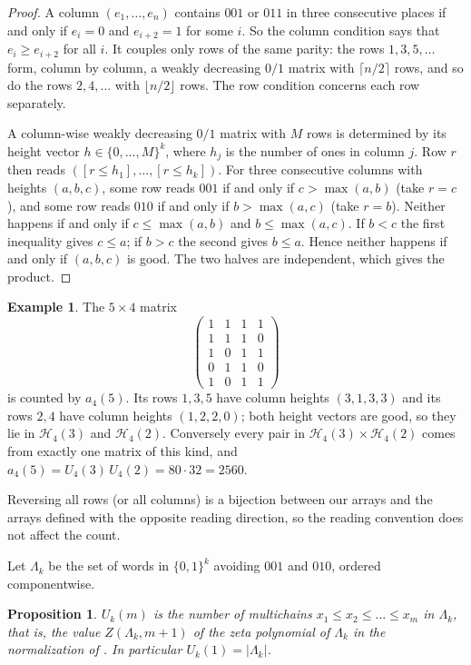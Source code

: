 \documentclass[11pt]{amsart}
\newtheorem{proposition}[theorem]{Proposition}
\theoremstyle{definition}
\newtheorem{example}[theorem]{Example}
\begin{document}
\begin{proof}
A column $(e_1,\dots,e_n)$ contains $001$ or $011$ in three consecutive places if and only if $e_i=0$ and $e_{i+2}=1$ for some $i$. So the column condition says that $e_i\ge e_{i+2}$ for all $i$. It couples only rows of the same parity: the rows $1,3,5,\dots$ form, column by column, a weakly decreasing $0/1$ matrix with $\lceil n/2\rceil$ rows, and so do the rows $2,4,\dots$ with $\lfloor n/2\rfloor$ rows. The row condition concerns each row separately.

A column-wise weakly decreasing $0/1$ matrix with $M$ rows is determined by its height vector $h\in\{0,\dots,M\}^k$, where $h_j$ is the number of ones in column $j$. Row $r$ then reads $([r\le h_1],\dots,[r\le h_k])$. For three consecutive columns with heights $(a,b,c)$, some row reads $001$ if and only if $c>\max(a,b)$ (take $r=c$), and some row reads $010$ if and only if $b>\max(a,c)$ (take $r=b$). Neither happens if and only if $c\le\max(a,b)$ and $b\le\max(a,c)$. If $b<c$ the first inequality gives $c\le a$; if $b>c$ the second gives $b\le a$. Hence neither happens if and only if $(a,b,c)$ is good. The two halves are independent, which gives the product.
\end{proof}

\begin{example}\label{ex:matrix}
The $5\times4$ matrix
\[
\begin{pmatrix}1&1&1&1\\1&1&1&0\\1&0&1&1\\0&1&1&0\\1&0&1&1\end{pmatrix}
\]
is counted by $a_4(5)$. Its rows $1,3,5$ have column heights $(3,1,3,3)$ and its rows $2,4$ have column heights $(1,2,2,0)$; both height vectors are good, so they lie in $\mathcal H_4(3)$ and $\mathcal H_4(2)$. Conversely every pair in $\mathcal H_4(3)\times \mathcal H_4(2)$ comes from exactly one matrix of this kind, and $a_4(5)=U_4(3)\,U_4(2)=80\cdot32=2560$.
\end{example}

Reversing all rows (or all columns) is a bijection between our arrays and the arrays defined with the opposite reading direction, so the reading convention does not affect the count.

Let $\Lambda_k$ be the set of words in $\{0,1\}^k$ avoiding $001$ and $010$, ordered componentwise.

\begin{proposition}\label{prop:multichain}
$U_k(m)$ is the number of multichains $x_1\le x_2\le\dots\le x_m$ in $\Lambda_k$, that is, the value $Z(\Lambda_k,m+1)$ of the zeta polynomial of $\Lambda_k$ in the normalization of \cite[Section~3.12]{StanleyEC1}. In particular $U_k(1)=|\Lambda_k|$.
\end{proposition}
\end{document}
